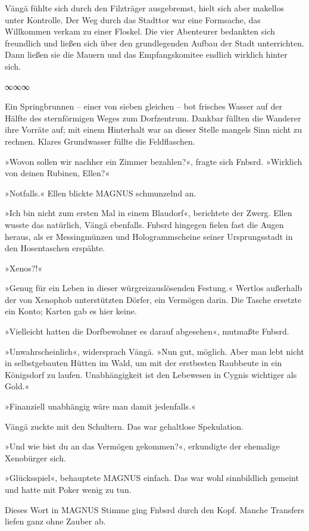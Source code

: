 Vängä fühlte sich durch den Filzträger ausgebremst, hielt sich aber makellos unter Kontrolle. Der Weg durch das Stadttor war eine Formsache, das Willkommen verkam zu einer Floskel. Die vier Abenteurer bedankten sich freundlich und ließen sich über den grundlegenden Aufbau der Stadt unterrichten. Dann ließen sie die Mauern und das Empfangskomitee endlich wirklich hinter sich.

\begin{center}
∞∞∞
\end{center}

Ein Springbrunnen – einer von sieben gleichen – bot frisches Wasser auf der Hälfte des sternförmigen Weges zum Dorfzentrum. Dankbar füllten die Wanderer ihre Vorräte auf; mit einem Hinterhalt war an dieser Stelle mangels Sinn nicht zu rechnen. Klares Grundwasser füllte die Feldflaschen.

»Wovon sollen wir nachher ein Zimmer bezahlen?«, fragte sich Fnbsrd. »Wirklich von deinen Rubinen, Ellen?«

»Notfalls.« Ellen blickte MAGNUS schmunzelnd an.

»Ich bin nicht zum ersten Mal in einem Blaudorf«, berichtete der Zwerg. Ellen wusste das natürlich, Vängä ebenfalls. Fnbsrd hingegen fielen fast die Augen heraus, als er Messingmünzen und Hologrammscheine seiner Ursprungsstadt in den Hosentaschen erspähte.

»Xenos?!«

»Genug für ein Leben in dieser würgreizauslösenden Festung.« Wertlos außerhalb der von Xenophob unterstützten Dörfer, ein Vermögen darin. Die Tasche ersetzte ein Konto; Karten gab es hier keine.

»Vielleicht hatten die Dorfbewohner es darauf abgesehen«, mutmaßte Fnbsrd.

»Unwahrscheinlich«, widersprach Vängä. »Nun gut, möglich. Aber man lebt nicht in selbstgebauten Hütten im Wald, um mit der erstbesten Raubbeute in ein Königsdorf zu laufen. Unabhängigkeit ist den Lebewesen in Cygnis wichtiger als Gold.«

»Finanziell unabhängig wäre man damit jedenfalls.«

Vängä zuckte mit den Schultern. Das war gehaltlose Spekulation.

»Und wie bist du an das Vermögen gekommen?«, erkundigte der ehemalige Xenobürger sich.

»Glücksspiel«, behauptete MAGNUS einfach. Das war wohl sinnbildlich gemeint und hatte mit Poker wenig zu tun.

 Dieses Wort in MAGNUS Stimme ging Fnbsrd durch den Kopf. Manche Transfers liefen ganz ohne Zauber ab.

